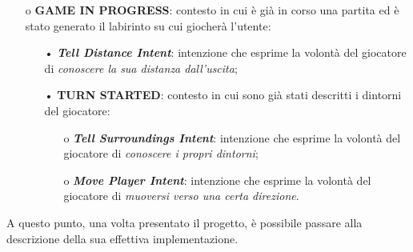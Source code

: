 \begin{itemize}
\begin{itemize}
          \item[o] \textbf{GAME IN PROGRESS}: contesto in cui è già in corso
                una partita ed è stato generato il labirinto su cui giocherà
                l’utente:
                \begin{itemize}
                  \item[•] \textit{\textbf{Tell Distance Intent}}: intenzione
                        che esprime la volontà del giocatore di
                        \textit{conoscere la sua distanza dall’uscita};
                  \item[•] \textbf{TURN STARTED}: contesto in cui sono già
                        stati descritti i dintorni del giocatore:
                        \begin{itemize}
                          \item[o] \textit{\textbf{Tell Surroundings Intent}}:
                                intenzione che esprime la volontà del giocatore
                                di \textit{conoscere i propri dintorni};
                          \item[o] \textit{\textbf{Move Player Intent}}:
                                intenzione che esprime la volontà del giocatore
                                di \textit{muoversi verso una certa direzione}.
                        \end{itemize}
                \end{itemize}
        \end{itemize}
\end{itemize}

A questo punto, una volta presentato il progetto, è possibile passare alla
descrizione della sua effettiva implementazione.